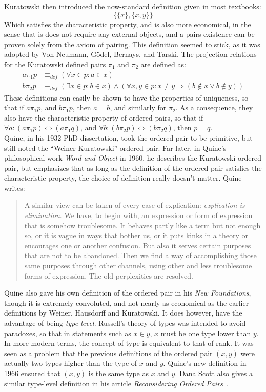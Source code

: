 \documentclass[11pt]{report}
\newcommand{\eqdef}{\equiv_\mathit{def}}
\newcommand{\pleft}{\mathrel{\pi_1}}
\newcommand{\pright}{\mathrel{\pi_2}}
\theoremstyle{definition}
\theoremstyle{theorem}
\theoremstyle{lemma}
\begin{document}
Kuratowski then introduced the now-standard definition given in most textbooks:
$$\{\{x\},\{x,y\}\}$$
Which satisfies the characteristic property, and is also more economical, in the sense that is does not require any external objects, and a pairs existence can be proven solely from the axiom of pairing.
This definition seemed to stick, as it was adopted by Von Neumann, G\"odel, Bernays, and Tarski.  
The projection relations for the Kuratowski defined pairs $\pleft$ and $\pright$ are defined as:
\begin{align*}
a\pleft p &\eqdef (\forall x\in p: a\in x) \\
b\pright p &\eqdef (\exists x\in p: b\in x) \wedge
                (\forall x,y \in p: x\neq y \Rightarrow (b\notin x \vee b\notin y))
\end{align*}
These definitions can easily be shown to have the properties of uniqueness, so that if $a\pleft p$, and $b\pleft p$, then $a=b$, and similarly for $\pright$. As a consequence, they also have the characteristic property of ordered pairs, so that if $\forall a: (a\pleft p)\Leftrightarrow(a\pleft q)$, and $\forall b: (b\pright p)\Leftrightarrow(b\pright q)$, then $p=q$.\\

Quine, in his 1932 PhD dissertation, took the ordered pair to be primitive, but still noted the ``Weiner-Kuratowski'' ordered pair. 
Far later, in Quine's philosophical work \emph{Word and Object} in 1960, he describes the Kuratowski ordered pair, but emphasizes that as long as the definition of the ordered pair satisfies the characteristic property, the choice of definition really doesn't matter. 
Quine writes: 
\begin{quotation}
A similar view can be taken of every case of explication: \emph{explication
is elimination}. We have, to begin with, an expression or form of
expression that is somehow troublesome. It behaves partly like a
term but not enough so, or it is vague in ways that bother us, or it
puts kinks in a theory or encourages one or another confusion. But
also it serves certain purposes that are not to be abandoned. Then
we find a way of accomplishing those same purposes through other
channels, using other and less troublesome forms of expression.
The old perplexities are resolved.
\end{quotation}
Quine also gave his own definition of the ordered pair in his \emph{New Foundations}, though it is extremely convoluted, and not nearly as economical as the earlier definitions by Weiner, Hausdorff and Kuratowski.
It does however, have the advantage of being \emph{type-level}. 
Russell's theory of types was intended to avoid paradoxes, so that in statements such as $x\in y$, $x$ must be one type lower than $y$. 
In more modern terms, the concept of type is equivalent to that of rank. 
It was seen as a problem that the previous definitions of the ordered pair $(x,y)$ were actually two types higher than the type of $x$ and $y$.
Quine's new definition in 1966 ensured that $(x,y)$ is the same type as $x$ and $y$.
Dana Scott also gives a similar type-level definition in his article \emph{Reconsidering Ordered Pairs}~\cite{dscott}.
\end{document}
